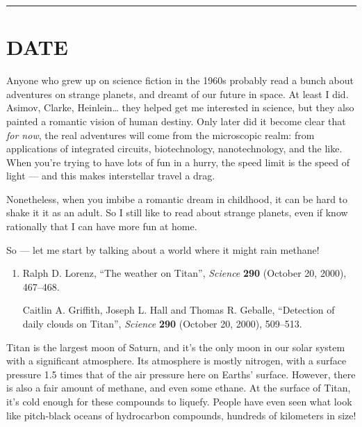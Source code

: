 \documentclass{article}
\begin{document}
\begin{center}\rule{0.5\linewidth}{0.5pt}\end{center}
\hypertarget{week160}{%
\section{DATE}\label{week160}}

Anyone who grew up on science fiction in the 1960s probably read a bunch
about adventures on strange planets, and dreamt of our future in space.
At least I did. Asimov, Clarke, Heinlein\ldots{} they helped get me
interested in science, but they also painted a romantic vision of human
destiny. Only later did it become clear that \emph{for now}, the real
adventures will come from the microscopic realm: from applications of
integrated circuits, biotechnology, nanotechnology, and the like. When
you're trying to have lots of fun in a hurry, the speed limit is the
speed of light --- and this makes interstellar travel a drag.

Nonetheless, when you imbibe a romantic dream in childhood, it can be
hard to shake it it as an adult. So I still like to read about strange
planets, even if know rationally that I can have more fun at home.

So --- let me start by talking about a world where it might rain
methane!

\begin{enumerate}
\def\labelenumi{\arabic{enumi})}
\item
  Ralph D. Lorenz, ``The weather on Titan'', \emph{Science} \textbf{290}
  (October 20, 2000), 467--468.

  Caitlin A. Griffith, Joseph L. Hall and Thomas R. Geballe, ``Detection
  of daily clouds on Titan'', \emph{Science} \textbf{290} (October 20,
  2000), 509--513.
\end{enumerate}

Titan is the largest moon of Saturn, and it's the only moon in our solar
system with a significant atmosphere. Its atmosphere is mostly nitrogen,
with a surface pressure 1.5 times that of the air pressure here on
Earths' surface. However, there is also a fair amount of methane, and
even some ethane. At the surface of Titan, it's cold enough for these
compounds to liquefy. People have even seen what look like pitch-black
oceans of hydrocarbon compounds, hundreds of kilometers in size!
\end{document}
